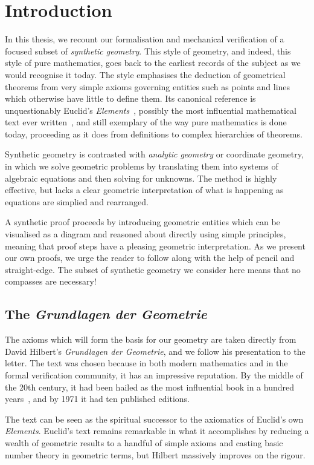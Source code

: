 \chapter{Introduction}\label{chapter:Introduction}
In this thesis, we recount our formalisation and mechanical verification of a focused subset of \emph{synthetic geometry}. This style of geometry, and indeed, this style of pure mathematics, goes back to the earliest records of the subject as we would recognise it today. The style emphasises the deduction of geometrical theorems from very simple axioms governing entities such as points and lines which otherwise have little to define them. Its canonical reference is unquestionably Euclid's \emph{Elements}~\cite{HeathElements}, possibly the most influential mathematical text ever written~\cite{BoyerEuclidInfluence}, and still exemplary of the way pure mathematics is done today, proceeding as it does from definitions to complex hierarchies of theorems.

Synthetic geometry is contrasted with \emph{analytic geometry} or coordinate geometry, in which we solve geometric problems by translating them into systems of algebraic equations and then solving for unknowns. The method is highly effective, but lacks a clear geometric interpretation of what is happening as equations are simplied and rearranged.

A synthetic proof proceeds by introducing geometric entities which can be visualised as a diagram and reasoned about directly using simple principles, meaning that proof steps have a pleasing geometric interpretation. As we present our own proofs, we urge the reader to follow along with the help of pencil and straight-edge. The subset of synthetic geometry we consider here means that no compasses are necessary!

\section{The \emph{Grundlagen der Geometrie}}
The axioms which will form the basis for our geometry are taken directly from David Hilbert's \emph{Grundlagen der Geometrie}, and we follow his presentation to the letter. The text was chosen because in both modern mathematics and in the formal verification community, it has an impressive reputation. By the middle of the 20th century, it had been hailed as the most influential book in a hundred years~\cite{BirkhoffHilbertInfluence}, and by 1971 it had ten published editions. 

The text can be seen as the spiritual successor to the axiomatics of Euclid's own \emph{Elements}. Euclid's text remains remarkable in what it accomplishes by reducing a wealth of geometric results to a handful of simple axioms and casting basic number theory in geometric terms, but Hilbert massively improves on the rigour.

